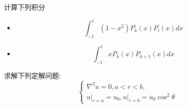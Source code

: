 \documentclass[11pt]{article}
\begin{document}
\vspace{0.5cm}




\begin{hwproblem}{}
计算下列积分
\begin{itemize}
  \item[(1)] $$
  \int_{-1}^1\left(1-x^2\right) P_k^{\prime}(x) P_l^{\prime}(x) d x
  $$
  \item[(2)]
  $$
\int_{-1}^1 x P_k(x) P_{k+1}(x) d x
$$
\end{itemize}
\end{hwproblem}

\vspace{0.5cm}

\begin{hwproblem}{}
  求解下列定解问题: 
  $$\left\{\begin{array}{l}
    \nabla^2 u=0, a<r<b, \\ 
    \left.u\right|_{r=a}=u_0,\left.u\right|_{r=b}=u_0 \cos ^2 \theta
  \end{array}\right.$$
\end{hwproblem}

\vspace{0.5cm}



\vspace{0.5cm}

\hwrequirements
\end{document}
